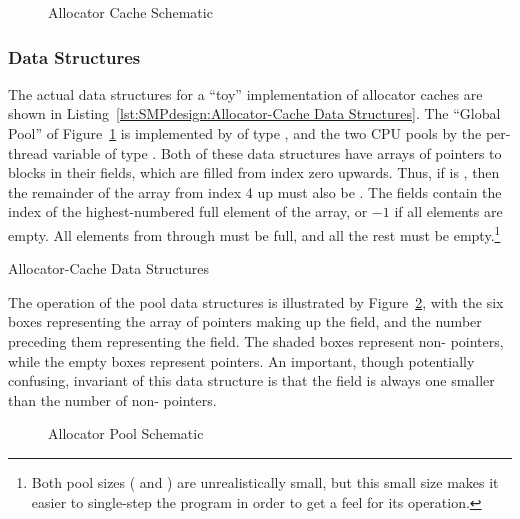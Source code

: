 \begin{figure}[tbp]
\centering
{}
\caption{Allocator Cache Schematic}
\label{fig:SMPdesign:Allocator Cache Schematic}
\end{figure}

\subsubsection{Data Structures}

The actual data structures for a ``toy'' implementation of allocator
caches are shown in
Listing~\ref{lst:SMPdesign:Allocator-Cache Data Structures}.
The ``Global Pool'' of Figure~\ref{fig:SMPdesign:Allocator Cache Schematic}
is implemented by  of type ,
and the two CPU pools by the per-thread variable  of
type .
Both of these data structures have arrays of pointers to blocks
in their  fields, which are filled from index zero upwards.
Thus, if  is , then the remainder of
the array from index 4 up must also be .
The  fields contain the index of the highest-numbered full
element of the  array, or $-1$ if all elements are empty.
All elements from  through
 must be full, and all the rest
must be empty.\footnote{
	Both pool sizes ( and
	) are unrealistically small, but this small
	size makes it easier to single-step the program in order to get
	a feel for its operation.}

\begin{listing}[tbp]

\caption{Allocator-Cache Data Structures}
\label{lst:SMPdesign:Allocator-Cache Data Structures}
\end{listing}

The operation of the pool data structures is illustrated by
Figure~\ref{fig:SMPdesign:Allocator Pool Schematic},
with the six boxes representing the array of pointers making up
the  field, and the number preceding them representing
the  field.
The shaded boxes represent non- pointers, while the empty
boxes represent  pointers.
An important, though potentially confusing, invariant of this
data structure is that the  field is always one
smaller than the number of non- pointers.

\begin{figure}[tbp]
\centering
{}
\caption{Allocator Pool Schematic}
\label{fig:SMPdesign:Allocator Pool Schematic}
\end{figure}

